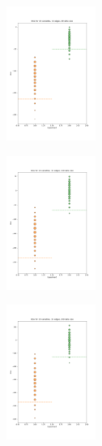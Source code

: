 \documentclass{lxaiproposal}
\begin{document}
    \begin{figure}[h]
        \centering
        \begin{subfigure}
            \centering
            \includegraphics[width=0.32\textwidth]{figures/BGe_10_15_80}
            \label{fig:bge_score_10_15_80}
        \end{subfigure}
        \begin{subfigure}
            \centering
            \includegraphics[width=0.32\textwidth]{figures/BGe_10_15_150}
            \label{fig:bge_score_10_15_150}
        \end{subfigure}
        \begin{subfigure}
            \centering
            \includegraphics[width=0.32\textwidth]{figures/BGe_10_15_250}

\end{subfigure}
\end{figure}
\end{document}
